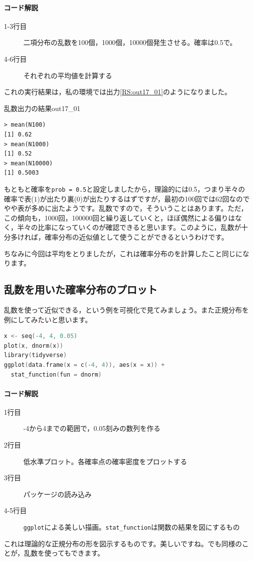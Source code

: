 \documentclass{ltjsbook}
\begin{document}
\paragraph{コード解説}
\begin{description}
  \item[1-3行目] 二項分布の乱数を100個，1000個，10000個発生させる。確率は0.5で。
  \item[4-6行目] それぞれの平均値を計算する
\end{description}
これの実行結果は，私の環境では出力\ref{RS:out17_01}のようになりました。
\begin{Rscreen}{乱数出力の結果}{out17_01}
  \begin{verbatim}
> mean(N100)
[1] 0.62
> mean(N1000)
[1] 0.52
> mean(N10000)
[1] 0.5003\end{verbatim}
\end{Rscreen}

もともと確率を\texttt{prob = 0.5}と設定しましたから，理論的には0.5，つまり半々の確率で表($1$)が出たり裏($0$)が出たりするはずですが，最初の100回では62回なのでやや表が多めに出たようです。乱数ですので，そういうことはあります。ただ，この傾向も，1000回，100000回と繰り返していくと，ほぼ偶然による偏りはなく，半々の比率になっていくのが確認できると思います。このように，乱数が十分多ければ，確率分布の近似値として使うことができるというわけです。

ちなみに今回は平均をとりましたが，これは確率分布のを計算したこと同じになります。
\subsection{乱数を用いた確率分布のプロット}
乱数を使って近似できる，という例を可視化で見てみましょう。また正規分布を例にしてみたいと思います。
\begin{lstlisting}[language=c++,label={code:17_04},caption={確率分布の可視化1}]
x <- seq(-4, 4, 0.05)
plot(x, dnorm(x))
library(tidyverse)
ggplot(data.frame(x = c(-4, 4)), aes(x = x)) +
  stat_function(fun = dnorm)
\end{lstlisting}
\paragraph{コード解説}
\begin{description}
  \item[1行目] -4から4までの範囲で，0.05刻みの数列を作る
  \item[2行目] 低水準プロット。各確率点の確率密度をプロットする
  \item[3行目] パッケージの読み込み
  \item[4-5行目] \texttt{ggplot}による美しい描画。\verb|stat_function|は関数の結果を図にするもの
\end{description}
これは理論的な正規分布の形を図示するものです。美しいですね。でも同様のことが，乱数を使ってもできます。
\end{document}
